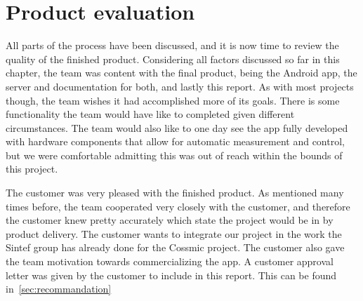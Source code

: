 \section{Product evaluation}
All parts of the process have been discussed, and it is now time to review the quality of the finished product. Considering all factors discussed so far in this chapter, the team was content with the final product, being the Android app, the server and documentation for both, and lastly this report. As with most projects though, the team wishes it had accomplished more of its goals. There is some functionality the team would have like to completed given different circumstances. The team would also like to one day see the app  fully developed with hardware components that allow for automatic measurement and control, but we were comfortable admitting this was out of reach within the bounds of this project. 

The customer was very pleased with the finished product. As mentioned many times before, the team cooperated very closely with the customer, and therefore the customer knew pretty accurately which state the project would be in by product delivery. The customer wants to integrate our project in the work the Sintef group has already done for the Cossmic project. The customer also gave the team motivation towards commercializing the app. A customer approval letter was given by the customer to include in this report. This can be found in~\ref{sec:recommandation}